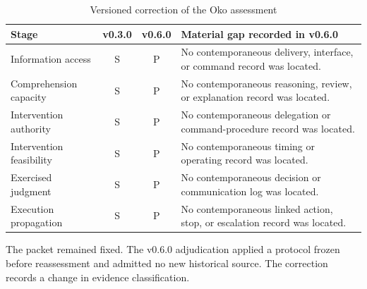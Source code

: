 \begin{table}[t]
\centering
\begin{threeparttable}
\caption{Versioned correction of the Oko assessment}
\label{tab:oko-correction}
\begin{tabularx}{\linewidth}{l c c X}
\toprule
Stage & v0.3.0 & v0.6.0 & Material gap recorded in v0.6.0 \\
\midrule
Information access & S & P & No contemporaneous delivery, interface, or command record was located. \\
Comprehension capacity & S & P & No contemporaneous reasoning, review, or explanation record was located. \\
Intervention authority & S & P & No contemporaneous delegation or command-procedure record was located. \\
Intervention feasibility & S & P & No contemporaneous timing or operating record was located. \\
Exercised judgment & S & P & No contemporaneous decision or communication log was located. \\
Execution propagation & S & P & No contemporaneous linked action, stop, or escalation record was located. \\
\bottomrule
\end{tabularx}
\begin{tablenotes}[flushleft]\footnotesize
\item The packet remained fixed. The v0.6.0 adjudication applied a protocol frozen before reassessment and admitted no new historical source. The correction records a change in evidence classification.
\end{tablenotes}
\end{threeparttable}
\end{table}

